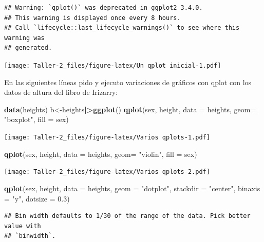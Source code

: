 \documentclass[
]{article}
\newenvironment{Shaded}{\begin{snugshade}}{\end{snugshade}}
\newcommand{\AttributeTok}[1]{\textcolor[rgb]{0.13,0.29,0.53}{#1}}
\newcommand{\FloatTok}[1]{\textcolor[rgb]{0.00,0.00,0.81}{#1}}
\newcommand{\FunctionTok}[1]{\textcolor[rgb]{0.13,0.29,0.53}{\textbf{#1}}}
\newcommand{\NormalTok}[1]{#1}
\newcommand{\OtherTok}[1]{\textcolor[rgb]{0.56,0.35,0.01}{#1}}
\newcommand{\SpecialCharTok}[1]{\textcolor[rgb]{0.81,0.36,0.00}{\textbf{#1}}}
\newcommand{\StringTok}[1]{\textcolor[rgb]{0.31,0.60,0.02}{#1}}
\begin{document}
\begin{verbatim}
## Warning: `qplot()` was deprecated in ggplot2 3.4.0.
## This warning is displayed once every 8 hours.
## Call `lifecycle::last_lifecycle_warnings()` to see where this warning was
## generated.
\end{verbatim}

\texttt{[image: Taller-2\_files/figure-latex/Un qplot inicial-1.pdf]}

En las siguientes líneas pido y ejecuto variaciones de gráficos con
qplot con los datos de altura del libro de Irizarry:

\begin{Shaded}
\begin{Highlighting}[]
\FunctionTok{data}\NormalTok{(heights)            }
\NormalTok{b}\OtherTok{\textless{}{-}}\NormalTok{heights}\SpecialCharTok{|\textgreater{}}\FunctionTok{ggplot}\NormalTok{()}
\FunctionTok{qplot}\NormalTok{(sex, height, }\AttributeTok{data =}\NormalTok{ heights, }\AttributeTok{geom=} \StringTok{"boxplot"}\NormalTok{, }\AttributeTok{fill =}\NormalTok{ sex)}
\end{Highlighting}
\end{Shaded}

\texttt{[image: Taller-2\_files/figure-latex/Varios qplots-1.pdf]}

\begin{Shaded}
\begin{Highlighting}[]
\FunctionTok{qplot}\NormalTok{(sex, height, }\AttributeTok{data =}\NormalTok{ heights, }\AttributeTok{geom=} \StringTok{"violin"}\NormalTok{, }\AttributeTok{fill =}\NormalTok{ sex)}
\end{Highlighting}
\end{Shaded}

\texttt{[image: Taller-2\_files/figure-latex/Varios qplots-2.pdf]}

\begin{Shaded}
\begin{Highlighting}[]
\FunctionTok{qplot}\NormalTok{(sex, height, }\AttributeTok{data =}\NormalTok{ heights, }\AttributeTok{geom =} \StringTok{"dotplot"}\NormalTok{,}
      \AttributeTok{stackdir =} \StringTok{"center"}\NormalTok{, }\AttributeTok{binaxis =} \StringTok{"y"}\NormalTok{, }\AttributeTok{dotsize =} \FloatTok{0.3}\NormalTok{)}
\end{Highlighting}
\end{Shaded}

\begin{verbatim}
## Bin width defaults to 1/30 of the range of the data. Pick better value with
## `binwidth`.
\end{verbatim}
\end{document}
